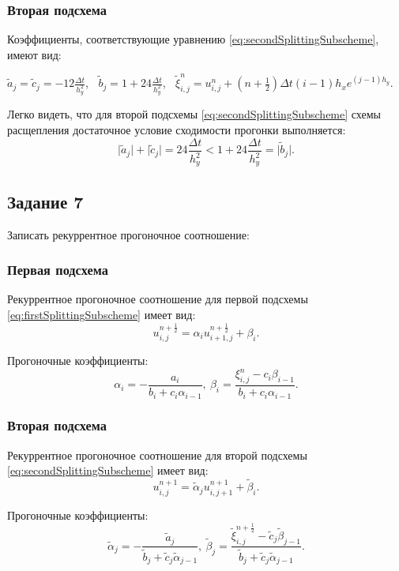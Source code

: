 \documentclass[12pt, a4paper]{report}
\begin{document}
	\subsubsection*{Вторая подсхема}
	\large
	Коэффициенты, соответствующие уравнению \eqref{eq:secondSplittingSubscheme}, имеют вид:
	\small
	\begin{center}
		$\tilde{a}_{j}=\tilde{c}_{j}=-12\frac{\Delta t}{h_{y}^{2}}$, $\>$ $\tilde{b}_{j}=1 + 24\frac{\Delta t}{h_{y}^{2}}$, $\>$ $\tilde{\xi}_{i, j}^{n}=u_{i, j}^{n} + (n + \frac{1}{2})\Delta t(i-1)h_{x}e^{(j-1)h_{y}}$.
	\end{center}
	\par
	\large
	Легко видеть, что для второй подсхемы \eqref{eq:secondSplittingSubscheme} схемы расщепления достаточное условие сходимости прогонки выполняется:
	\begin{equation*}
		\lvert \tilde{a}_{j} \rvert + \lvert \tilde{c}_{j} \rvert = 24\frac{\Delta t}{h_{y}^{2}} < 1 + 24\frac{\Delta t}{h_{y}^{2}} = \lvert \tilde{b}_{j} \rvert.
	\end{equation*}

	\subsection*{Задание 7}
	\large
	Записать рекуррентное прогоночное соотношение:
	\subsubsection*{Первая подсхема}
	\large
	Рекуррентное прогоночное соотношение для первой подсхемы \eqref{eq:firstSplittingSubscheme} имеет вид:
	\begin{equation*}
		u_{i, j}^{n+\frac{1}{2}} = \alpha_{i}u_{i+1, j}^{n+\frac{1}{2}} + \beta_{i}.
	\end{equation*}
	\par
	Прогоночные коэффициенты:
	\begin{equation*}
		\alpha_{i} = -\frac{a_{i}}{b_{i} + c_{i}\alpha_{i-1}}, \> \beta_{i} = \frac{\xi_{i, j}^{n} - c_{i}\beta_{i-1}}{b_{i} + c_{i}\alpha_{i-1}}.
	\end{equation*}
	\subsubsection*{Вторая подсхема}
	\large
	Рекуррентное прогоночное соотношение для второй подсхемы \eqref{eq:secondSplittingSubscheme} имеет вид:
	\begin{equation*}
		u_{i, j}^{n+1} = \tilde{\alpha}_{j}u_{i, j+1}^{n+1} + \tilde{\beta}_{i}.
	\end{equation*}
	\par
	Прогоночные коэффициенты:
	\begin{equation*}
		\tilde{\alpha}_{j} = -\frac{\tilde{a}_{j}}{\tilde{b}_{j} + \tilde{c}_{j}\tilde{\alpha}_{j-1}}, \> \tilde{\beta}_{j} = \frac{\tilde{\xi}_{i, j}^{n+\frac{1}{2}} - \tilde{c}_{j}\tilde{\beta}_{j-1}}{\tilde{b}_{j} + \tilde{c}_{j}\tilde{\alpha}_{j-1}}.
	\end{equation*}
\end{document}
